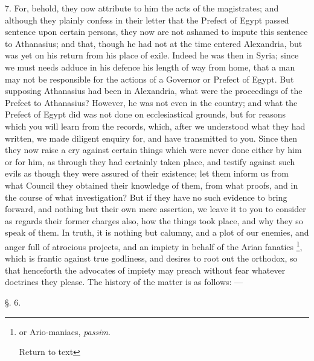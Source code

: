 7. For, behold, they now attribute to him the
acts of the magistrates; and although they plainly confess in their
letter that the Prefect of Egypt passed sentence upon certain persons,
they now are not ashamed to impute this sentence to Athanasius; and
that, though he had not at the time entered Alexandria, but was yet on
his return from his place of exile. Indeed he was then in Syria; since
we must needs adduce in his defence his length of way from home, that
a man may not be responsible for the actions of a Governor or Prefect
of Egypt. But supposing Athanasius had been in Alexandria, what were
the proceedings of the Prefect to Athanasius? However, he was not even
in the country; and what the Prefect of Egypt did was not done on
ecclesiastical grounds, but for reasons which you will learn from the
records, which, after we understood what they had written, we made
diligent enquiry for, and have transmitted to you. Since then they now
raise a cry against certain things which were never done either by him
or for him, as through they had certainly taken place, and testify
against such evils as though they were assured of their existence; let
them inform us from what Council they obtained their knowledge of
them, from what proofs, and in the course of what investigation? But
if they have no such evidence to bring forward, and nothing but their
own mere assertion, we leave it to you to consider as regards their
former charges also, how the things took place, and why they so speak
of them. In truth, it is nothing but calumny, and a plot of our
enemies, and anger full of atrocious projects, and an impiety in
behalf of the Arian fanatics \footnote{or Ario-maniacs, \emph{passim}.

Return to text},
which is frantic against true godliness, and desires to root out the
orthodox, so that henceforth the advocates of impiety may preach
without fear whatever doctrines they please. The history of the matter
is as follows: —

§. 6.

